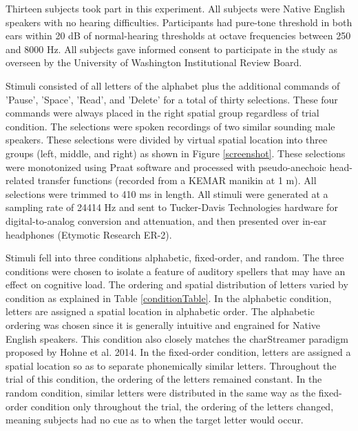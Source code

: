 \documentclass[10pt]{article}
\begin{document}
Thirteen subjects took part in this experiment.  All subjects were
Native English speakers with no hearing difficulties.  Participants
had pure-tone threshold in both ears within 20 dB of normal-hearing
thresholds at octave frequencies between 250 and 8000 Hz.  All
subjects gave informed consent to participate in the study as
overseen by the University of Washington Institutional Review Board.

Stimuli consisted of all letters of the alphabet plus the
additional commands of 'Pause', 'Space', 'Read', and 'Delete'
for a total of thirty selections.  These four commands were
always placed in the right spatial group regardless of trial
condition.  The selections were spoken recordings of two
similar sounding male speakers.  These selections were divided
by virtual spatial location into three groups (left, middle,
and right) as shown in Figure \ref{screenshot}.  These
selections were monotonized using Praat software and processed
with pseudo-anechoic head-related transfer functions (recorded
from a KEMAR manikin at 1 m).  All selections were trimmed to
410 ms in length.  All stimuli were generated at a
sampling rate of 24414 Hz and sent to Tucker-Davis
Technologies hardware for digital-to-analog conversion and
attenuation, and then presented over in-ear headphones
(Etymotic Research ER-2).

Stimuli fell into three conditions alphabetic, fixed-order, and
random.  The three conditions were chosen to isolate a feature of
auditory spellers that may have an effect on cognitive load.  The
ordering and spatial distribution of letters varied by condition as
explained in Table \ref{conditionTable}.  In the alphabetic
condition, letters are assigned a spatial location in alphabetic
order.  The alphabetic ordering was chosen since it is generally
intuitive and engrained for Native English speakers.  This condition
also closely matches the charStreamer paradigm proposed by Hohne et
al.  2014\cite{Hohne2014}.  In the fixed-order condition, letters
are assigned a spatial location so as to separate phonemically
similar letters.  Throughout the trial of this condition, the ordering
of the letters remained constant.  In the random condition, similar letters
were distributed in the same way as the fixed-order
condition only throughout the trial, the ordering of the letters
changed, meaning subjects had no cue as to when the target letter
would occur. 
\end{document}
